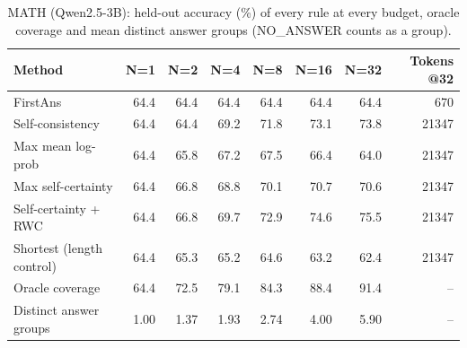 \begin{table}[t]
\centering
\small
\caption{MATH (Qwen2.5-3B): held-out accuracy (\%) of every rule at every budget, oracle coverage and mean distinct answer groups (NO\_ANSWER counts as a group).}
\label{tab:t3-curves-math}
\begin{tabular}{lrrrrrrr}
\toprule
Method & N=1 & N=2 & N=4 & N=8 & N=16 & N=32 & Tokens @32 \\
\midrule
FirstAns & 64.4 & 64.4 & 64.4 & 64.4 & 64.4 & 64.4 & 670 \\
Self-consistency & 64.4 & 64.4 & 69.2 & 71.8 & 73.1 & 73.8 & 21347 \\
Max mean log-prob & 64.4 & 65.8 & 67.2 & 67.5 & 66.4 & 64.0 & 21347 \\
Max self-certainty & 64.4 & 66.8 & 68.8 & 70.1 & 70.7 & 70.6 & 21347 \\
Self-certainty + RWC & 64.4 & 66.8 & 69.7 & 72.9 & 74.6 & 75.5 & 21347 \\
Shortest (length control) & 64.4 & 65.3 & 65.2 & 64.6 & 63.2 & 62.4 & 21347 \\
Oracle coverage & 64.4 & 72.5 & 79.1 & 84.3 & 88.4 & 91.4 & – \\
Distinct answer groups & 1.00 & 1.37 & 1.93 & 2.74 & 4.00 & 5.90 & – \\
\bottomrule
\end{tabular}
\end{table}
